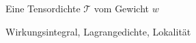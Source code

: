 \begin{definition}[Tensordichte]
Eine Tensordichte $\mathcal{T}$ vom Gewicht $w$
\end{definition}
Wirkungsintegral, Lagrangedichte, Lokalität
\begin{beispiel}
\end{beispiel}

